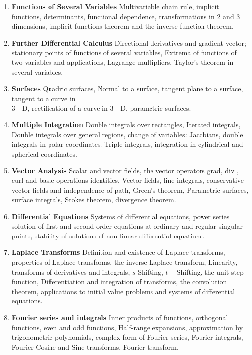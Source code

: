 \documentclass[11pt,a4paper]{article}
\theoremstyle{definition}
\begin{document}
\begin{enumerate}
\item \textbf{Functions of Several Variables}
Multivariable chain rule, implicit functions, determinants, functional dependence, transformations in 2 and 3 dimensions, implicit functions theorem and the inverse function theorem.

\item \textbf{Further Differential Calculus}
Directional derivatives and gradient vector; stationary points of functions of several variables, Extrema of functions of two  variables and applications, Lagrange multipliers, Taylor's theorem in several variables.

\item \textbf{Surfaces}
Quadric surfaces, Normal to a surface, tangent plane to a surface, tangent to a curve in\\ 3 - D, rectification of a curve in 3 - D, parametric surfaces.

\pagebreak
\thispagestyle{empty}
\item \textbf{Multiple Integration}
Double integrals over rectangles, Iterated integrals, Double integrals over general regions, change of variables: Jacobians, double integrals in polar coordinates. Triple integrals, integration in cylindrical and spherical coordinates.

\item\textbf{Vector Analysis}
Scalar and vector fields, the vector operators grad, div , curl and basic operations identities, Vector fields, line integrals, conservative vector fields and independence of path, Green's theorem, Parametric surfaces, surface integrals, Stokes theorem, divergence theorem.

\item \textbf{Differential Equations}
Systems of differential equations, power series solution of first and second order equations at ordinary and regular singular points, stability of solutions of non linear differential equations.

\item \textbf{Laplace Transforms}
Definition and existence of Laplace transforms, properties of Laplace transforms, the inverse Laplace transform, Linearity, transforms of derivatives and integrals, $s$-Shifting, $t-$Shifting, the unit step function, Differentiation and integration of transforms, the convolution theorem, applications to initial value problems and systems of differential equations.

\item \textbf{Fourier series and integrals}
Inner products of functions, orthogonal functions, even and odd functions, Half-range expansions, approximation by trigonometric polynomials, complex form of Fourier series, Fourier integrals, Fourier Cosine and Sine transforms, Fourier transform.
\end{enumerate}
\end{document}
